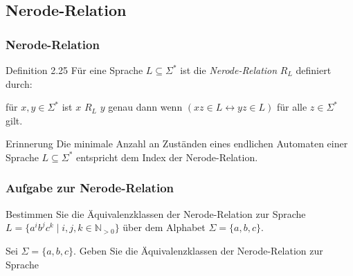 \documentclass{beamer}
\begin{document}
{{\begin{figure}[H]
\begin{center}
  \end{center}
  \end{figure}
}


\subsection{Nerode-Relation}
\begin{frame}
 \frametitle{Nerode-Relation}
 \begin{block}{Definition 2.25}
 Für eine Sprache \(L \subseteq \Sigma^*\) ist die \emph{Nerode-Relation} \(R_L\) definiert durch:
  
  für \(x, y \in \Sigma^*\) ist $x$ $R_L$ $y$ genau dann wenn \((xz \in L \leftrightarrow yz \in L)\) für alle $z \in \Sigma^*$ gilt.
 \end{block}
  \begin{block}{Erinnerung}
   Die minimale Anzahl an Zuständen eines endlichen Automaten einer Sprache $L \subseteq \Sigma^*$ entspricht dem Index der Nerode-Relation.
  \end{block}
\end{frame}
\begin{frame}
\frametitle{Aufgabe zur Nerode-Relation}
Bestimmen Sie die Äquivalenzklassen der Nerode-Relation zur Sprache $L=\{a^ib^jc^k \mid i,j,k \in \mathbb{N}_{>0} \}$ über dem Alphabet $\Sigma=\{a,b,c\}$.
\end{frame}
\begin{frame}
 Sei $\Sigma = \{a,b,c\}.$ Geben Sie die Äquivalenzklassen der Nerode-Relation
zur Sprache


\end{frame}}
\end{document}
